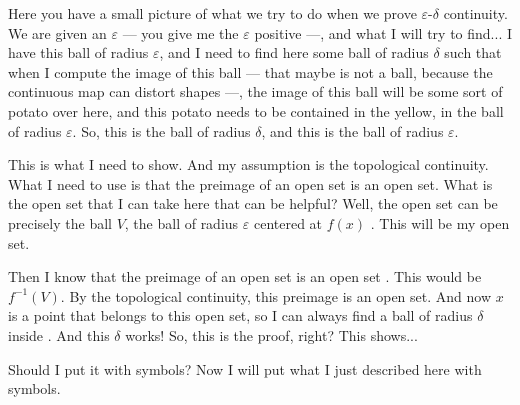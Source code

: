 \begin{speech}[00:01:57 - 00:03:55]
Here you have a small picture of what we try to do when we prove $\varepsilon$-$\delta$ continuity. We are given an $\varepsilon$ --- you give me the $\varepsilon$ positive ---, and what I will try to find... I have this ball of radius $\varepsilon$, and I need to find here some ball of radius $\delta$  such that when I compute the image of this ball --- that maybe is not a ball, because the continuous map can distort shapes ---, the image of this ball will be some sort of potato over here, and this potato needs to be contained in the yellow, in the ball of radius $\varepsilon$. So, this is the ball of radius $\delta$, and this is the ball of radius $\varepsilon$.

This is what I need to show. And my assumption is the topological continuity. What I need to use is that the preimage of an open set is an open set. What is the open set that I can take here that can be helpful? Well, the open set can be precisely the ball $V$, the ball of radius $\varepsilon$ centered at $f(x)$ . This will be my open set.

Then I know that the preimage of an open set is an open set . This would be $f^{-1}(V)$. By the topological continuity, this preimage is an open set. And now $x$ is a point that belongs to this open set, so I can always find a ball of radius $\delta$ inside . And this $\delta$ works! So, this is the proof, right? This shows...

Should I put it with symbols? Now I will put what I just described here with symbols.
\end{speech}

